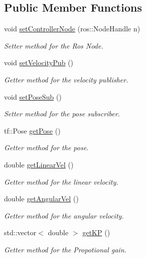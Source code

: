 \subsection*{Public Member Functions}
\begin{DoxyCompactItemize}
\item 
void \hyperlink{classPidController_a9fac1b4d96ee42bb5dcfe3233b62a43c}{set\+Controller\+Node} (ros\+::\+Node\+Handle n)
\begin{DoxyCompactList}\small\item\em Setter method for the Ros Node. \end{DoxyCompactList}\item 
void \hyperlink{classPidController_ab8266cd116e389dd9727b1004d30e550}{set\+Velocity\+Pub} ()
\begin{DoxyCompactList}\small\item\em Getter method for the velocity publisher. \end{DoxyCompactList}\item 
void \hyperlink{classPidController_a5b06cf528f6d76a3302895bb286bf635}{set\+Pose\+Sub} ()
\begin{DoxyCompactList}\small\item\em Setter method for the pose subscriber. \end{DoxyCompactList}\item 
tf\+::\+Pose \hyperlink{classPidController_af710fd85dbca2e5652fa72fe11ea686a}{get\+Pose} ()
\begin{DoxyCompactList}\small\item\em Getter method for the pose. \end{DoxyCompactList}\item 
double \hyperlink{classPidController_a4d2314f673a601146db48d638cec2fee}{get\+Linear\+Vel} ()
\begin{DoxyCompactList}\small\item\em Getter method for the linear velocity. \end{DoxyCompactList}\item 
double \hyperlink{classPidController_adbe1918df5a0a568f814f9cdbe2f4bd0}{get\+Angular\+Vel} ()
\begin{DoxyCompactList}\small\item\em Getter method for the angular velocity. \end{DoxyCompactList}\item 
std\+::vector$<$ double $>$ \hyperlink{classPidController_a0a384d931823901be789c032090e6953}{get\+KP} ()
\begin{DoxyCompactList}\small\item\em Getter method for the Propotional gain. \end{DoxyCompactList}\item 

\end{DoxyCompactItemize}
